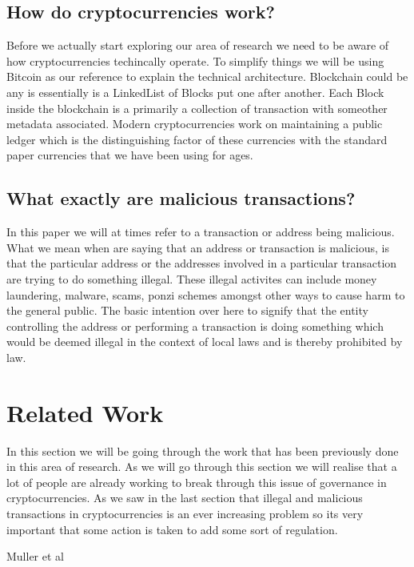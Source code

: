 \documentclass{article}
\begin{document}
\subsection{How do cryptocurrencies work?}
Before we actually start exploring our area of research we need to be aware of how cryptocurrencies techincally operate. To simplify things we will be using Bitcoin as our reference to explain the technical architecture. Blockchain could be any is essentially is a LinkedList \cite{} of Blocks put one after another. 
Each Block inside the blockchain is a primarily a collection of transaction with someother metadata associated.
Modern cryptocurrencies work on maintaining a public ledger which is the distinguishing factor of these currencies with the standard paper currencies that we have been using for ages. 
\subsection{What exactly are malicious transactions?}
In this paper we will at times refer to a transaction or address being malicious. What we mean when are saying that an address or transaction is malicious, is that the particular address or the addresses involved in a particular transaction are trying to do something illegal. These illegal activites can include money laundering, malware, scams, ponzi schemes amongst other ways to cause harm to the general public. The basic intention over here to signify that the entity controlling the address or performing a transaction is doing something which would be deemed illegal in the context of local laws and is thereby prohibited by law. 
\pagebreak

\cite{kethineni_cao_2019}
\pagebreak
\section{Related Work}
In this section we will be going through the work that has been previously done in this area of research. As we will go through this section we will realise that a lot of people are already working to break through this issue of governance in cryptocurrencies. As we saw in the last section that illegal and malicious transactions in cryptocurrencies is an ever increasing problem so its very important that some action is taken to add some sort of regulation.

Muller et al\cite{jochen_schäfer_christian_müller_and_frederik_..._-_petsymposium.org} 
\end{document}
